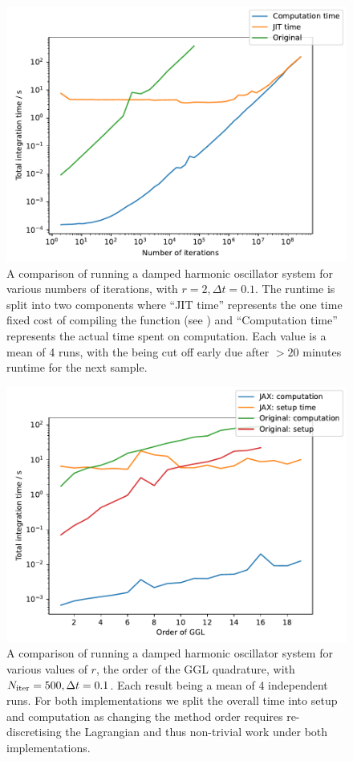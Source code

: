\begin{figure}[t]
  \includegraphics[width=\columnwidth]{figures/dho_n_runtime.pdf}
  \caption{A comparison of running a damped harmonic oscillator system for various numbers of iterations, with $r = 2, \Delta t = 0.1$. The \updimpl{} runtime is split into two components where \enquote{JIT time} represents the one time fixed cost of compiling the function (see ) and \enquote{Computation time} represents the actual time spent on computation.
  Each value is a mean of 4 runs, with the \orgimpl{} being cut off early due after $> 20$ minutes runtime for the next sample.}
  \label{fig:dho-n-runtime}
\end{figure}

\begin{figure}[t]
  \includegraphics[width=\columnwidth]{figures/dho_r_runtime.pdf}
  \caption{A comparison of running a damped harmonic oscillator system for various values of $r$, the order of the GGL quadrature, with $N_{\mathrm{iter}} = 500, \Delta t = 0.1$. Each result being a mean of 4 independent runs.
	For both implementations we split the overall time into setup and computation as changing the method order requires re-discretising the Lagrangian and thus non-trivial work under both implementations.}
  \label{fig:dho-r-runtime}
\end{figure}

